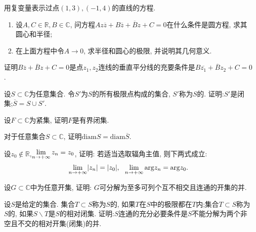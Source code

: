\begin{yyEx}
    用复变量表示过点$(1,3),(-1,4)$的直线的方程.
\end{yyEx}

\begin{yyEx}
    \begin{enumerate}
        \item 设$A,C\in\mathbb{R},B\in\mathbb{C}$, 问方程$Az\overline{z}+B\overline{z}+\overline{B}z+C = 0$在什么条件是圆方程, 求其圆心和半径;
        \item 在上面方程中令$A\to 0$, 求半径和圆心的极限, 并说明其几何意义.
    \end{enumerate}
\end{yyEx}

\begin{yyEx}
    证明$B\overline{z}+\overline{B}z+C= 0$是点$z_1,z_2$连线的垂直平分线的充要条件是$B\overline{z_1}+\overline{B}z_2+C = 0$.
\end{yyEx}

\begin{yyEx}
    设$S\subset \mathbb{C}$为任意集合. 令$S'$为$S$的所有极限点构成的集合, $S'$称为$S$的. 证明:$S'$是闭集;$\overline{S} = S\cup S'$.
\end{yyEx}

\begin{yyEx}
    设$F\subset\mathbb{C}$为紧集, 证明$F$是有界闭集.
\end{yyEx}

\begin{yyEx}
    对于任意集合$S\subset\mathbb{C}$, 证明$\mathrm{diam}S = \mathrm{diam}\overline{S}$.
\end{yyEx}

\begin{yyEx}
    设$z_0\notin \mathbb{R}$,$\begin{lgathered}\lim\limits_{n\to +\infty} z_n = z_0\end{lgathered}$, 证明: 若适当选取辐角主值, 则下两式成立:
    \begin{equation*}
        \lim\limits_{n\to+\infty}\lvert z_n\rvert = \lvert z_0\rvert,~~\lim\limits_{n\to+\infty}\mathrm{arg}z_n = \mathrm{arg}z_0.
    \end{equation*}
\end{yyEx}

\begin{yyEx}
    设$G\subset\mathbb{C}$中为任意开集, 证明: $G$可分解为至多可列个互不相交且连通的开集的并.
\end{yyEx}

\begin{yyEx}
    设$S$是给定的集合. 集合$T\subset S$称为$S$的, 如果$T$在$S$中的极限都在$T$内;集合$T\subset S$称为$S$的, 如果$S\backslash T$是$S$的相对闭集. 证明:$S$连通的充分必要条件是$S$不能分解为两个非空且不交的相对开集(闭集)的并.
\end{yyEx}

